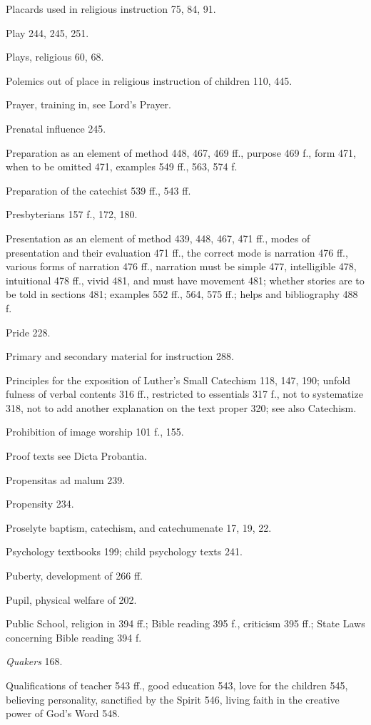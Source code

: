 Placards used in religious instruction 75, 84, 91.

Play 244, 245, 251.

Plays, religious 60, 68.

Polemics out of place in religious instruction of children 110, 445.

Prayer, training in, see Lord’s Prayer.

Prenatal influence 245.

Preparation as an element of method 448, 467, 469 ff., purpose 469 f., form 471, when to be omitted 471, examples 549 ff., 563, 574 f.

Preparation of the catechist 539 ff., 543 ff.

Presbyterians 157 f., 172, 180.

Presentation as an element of method 439, 448, 467, 471 ff., modes of presentation and their evaluation 471 ff., the correct mode is narration 476 ff., various forms of narration 476 ff., narration must be simple 477, intelligible 478, intuitional 478 ff., vivid 481, and must have movement 481; whether stories are to be told in sections 481; examples 552 ff., 564, 575 ff.; helps and bibliography 488 f.

Pride 228.

Primary and secondary material for instruction 288.

Principles for the exposition of Luther’s Small Catechism 118, 147, 190; unfold fulness of verbal contents 316 ff., restricted to essentials 317 f., not to systematize 318, not to add another explanation on the text proper 320; see also Catechism.

Prohibition of image worship 101 f., 155.

Proof texts see Dicta Probantia.

Propensitas ad malum 239.

Propensity 234.

Proselyte baptism, catechism, and catechumenate 17, 19, 22.

Psychology textbooks 199; child psychology texts 241.

Puberty, development of 266 ff.

Pupil, physical welfare of 202.

Public School, religion in 394 ff.; Bible reading 395 f., criticism 395 ff.; State Laws concerning Bible reading 394 f.

\emph{\emph{Quakers}} 168.

Qualifications of teacher 543 ff., good education 543, love for the children 545, believing personality, sanctified by the Spirit 546, living faith in the creative power of God’s Word 548.

